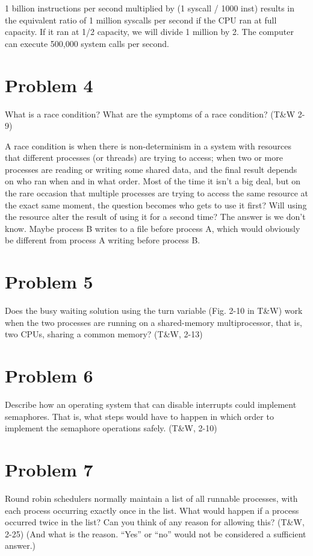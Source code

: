 \documentclass[11pt]{article}
\begin{document}
1 billion instructions per second multiplied by (1 syscall / 1000 inst) results in the equivalent ratio of 1 million syscalls per second if the CPU ran at full capacity. If it ran at 1/2 capacity, we will divide 1 million by 2. The computer can execute 500,000 system calls per second. 


\section*{Problem 4}
What is a race condition? What are the symptoms of a race condition? (T\&W 2-9)

A race condition is when there is non-determinism in a system with resources that different processes (or threads) are trying to access; when two or more processes are reading or writing some shared data, and the final result depends on who ran when and in what order. Most of the time it isn't a big deal, but on the rare occasion that multiple processes are trying to access the same resource at the exact same moment, the question becomes who gets to use it first? Will using the resource alter the result of using it for a second time? The answer is we don't know. Maybe process B writes to a file before process A, which would obviously be different from process A writing before process B.


\section*{Problem 5}
Does the busy waiting solution using the turn variable (Fig. 2-10 in T\&W) work when the two processes are running on a shared-memory multiprocessor, that is, two CPUs, sharing a common memory? (T\&W, 2-13)


\section*{Problem 6}
Describe how an operating system that can disable interrupts could implement semaphores. That is, what steps would have to happen in which order to implement the semaphore operations safely. (T\&W, 2-10)


\section*{Problem 7}
Round robin schedulers normally maintain a list of all runnable processes, with each process occurring exactly once in the list. What would happen if a process occurred twice in the list? Can you think of any reason for allowing this? (T\&W, 2-25) (And what is the reason. “Yes” or “no” would not be considered a sufficient answer.)
\end{document}
